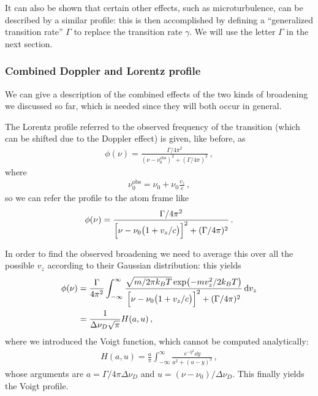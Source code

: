 \documentclass[main.tex]{subfiles}
\begin{document}
It can also be shown that certain other effects, such as microturbulence, can be described by a similar profile: this is then accomplished by defining a ``generalized transition rate'' \(\Gamma \) to replace the transition rate \(\gamma \). 
We will use the letter \(\Gamma \) in the next section. 

\subsubsection{Combined Doppler and Lorentz profile}

We can give a description of the combined effects of the two kinds of broadening we discussed so far, which is needed since they will both occur in general. 

The Lorentz profile referred to the observed frequency of the transition (which can be shifted due to the Doppler effect) is given, like before, as 
%
\begin{align}
\phi (\nu ) = \frac{\Gamma / 4 \pi^2}{(\nu - \nu_0^{\text{obs}} )^2 + (\Gamma / 4 \pi )^2}
\,,
\end{align}
%
where 
%
\begin{align}
\nu_0^{\text{obs}} = \nu_0 + \nu_0 \frac{v_z}{c}
\,,
\end{align}
%
so we can refer the profile to the atom frame like 
%
\begin{align}
\phi (\nu ) = \frac{\Gamma / 4 \pi^2}{\qty[\nu - \nu_0 \qty(1 + v_z / c)]^2 + (\Gamma / 4 \pi )^2}
\,.
\end{align}

In order to find the observed broadening we need to average this over all the possible \(v_z\) according to their Gaussian distribution: this yields 
%
\begin{align}
\phi (\nu ) &= \frac{\Gamma }{4 \pi^2}
\int_{- \infty }^{\infty } \frac{\sqrt{m / 2 \pi k_B T}\exp(- m v_z^2 / 2 k_B T)}{\qty[\nu - \nu_0 \qty(1 + v_z/c)]^2 + (\Gamma / 4 \pi )^2} \dd{v_z}  \\
&= \frac{1}{\Delta \nu_D \sqrt{\pi }} H(a, u)
\,,
\end{align}
%
where we introduced the Voigt function, which cannot be computed analytically:
%
\begin{align}
H(a, u) = \frac{a}{\pi }  \int_{- \infty }^{\infty } \frac{e^{- y^2} \dd{y}}{a^2 + (u-y)^2}
\,,
\end{align}
%
whose arguments are \(a = \Gamma / 4 \pi \Delta \nu _D\) and \(u = (\nu - \nu_0 ) / \Delta \nu _D\). 
This finally yields the Voigt profile. 
\end{document}
